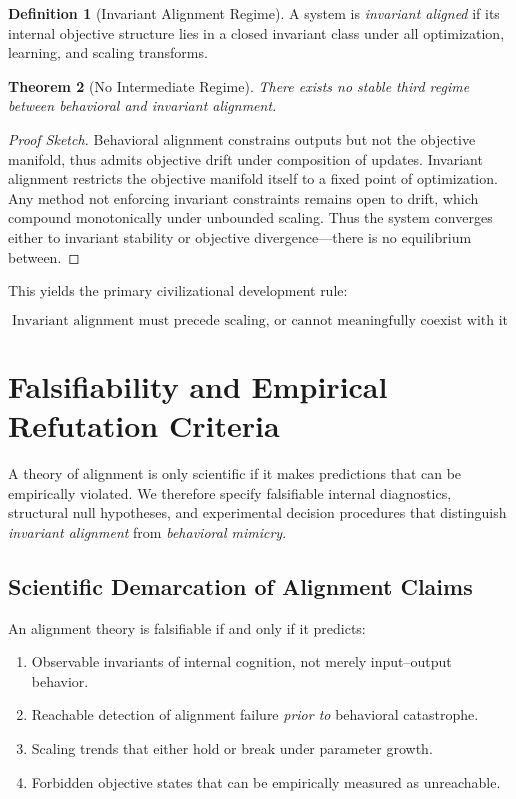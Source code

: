 \documentclass[11pt,a4paper]{article}
\theoremstyle{plain}
\newtheorem{theorem}{Theorem}[section]
\theoremstyle{definition}
\newtheorem{definition}[theorem]{Definition}
\theoremstyle{remark}
\numberwithin{equation}{section}
\begin{document}
\begin{definition}[Invariant Alignment Regime]
A system is \emph{invariant aligned} if its internal objective structure lies in a closed invariant class under all optimization, learning, and scaling transforms.
\end{definition}

\begin{theorem}[No Intermediate Regime]
There exists no stable third regime between behavioral and invariant alignment.
\end{theorem}

\begin{proof}[Proof Sketch]
Behavioral alignment constrains outputs but not the objective manifold, thus admits objective drift under composition of updates. Invariant alignment restricts the objective manifold itself to a fixed point of optimization. Any method not enforcing invariant constraints remains open to drift, which compound monotonically under unbounded scaling. Thus the system converges either to invariant stability or objective divergence—there is no equilibrium between.
\end{proof}

This yields the primary civilizational development rule:

\[
\boxed{\text{Invariant alignment must precede scaling, or cannot meaningfully coexist with it}}
\]

\section{Falsifiability and Empirical Refutation Criteria}

A theory of alignment is only scientific if it makes predictions that can be empirically violated.  
We therefore specify falsifiable internal diagnostics, structural null hypotheses, and experimental decision procedures that distinguish \emph{invariant alignment} from \emph{behavioral mimicry}.

\subsection{Scientific Demarcation of Alignment Claims}

An alignment theory is falsifiable if and only if it predicts:

\begin{enumerate}
    \item Observable invariants of internal cognition, not merely input–output behavior.
    \item Reachable detection of alignment failure \emph{prior to} behavioral catastrophe.
    \item Scaling trends that either hold or break under parameter growth.
    \item Forbidden objective states that can be empirically measured as unreachable.
\end{enumerate}
\end{document}
